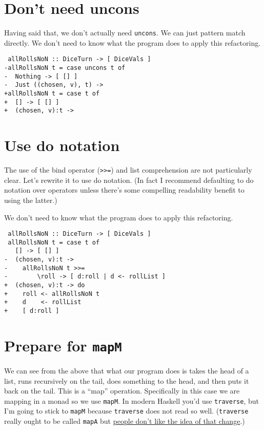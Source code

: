 \section{Don't need uncons}


Having said that, we don't actually need \texttt{uncons}. We can just pattern match directly. We don't need to know what the program does to apply this refactoring.

\begin{verbatim}
 allRollsNoN :: DiceTurn -> [ DiceVals ]
-allRollsNoN t = case uncons t of
-  Nothing -> [ [] ]
-  Just ((chosen, v), t) ->
+allRollsNoN t = case t of
+  [] -> [ [] ]
+  (chosen, v):t ->
\end{verbatim}

\section{Use do notation}

The use of the bind operator (\texttt{>>=}) and list comprehension are not particularly clear. Let's rewrite it to use do notation. (In fact I recommend defaulting to do notation over operators unless there's some compelling readability benefit to using the latter.)

We don't need to know what the program does to apply this refactoring.

\begin{verbatim}
 allRollsNoN :: DiceTurn -> [ DiceVals ]
 allRollsNoN t = case t of
   [] -> [ [] ]
-  (chosen, v):t ->
-    allRollsNoN t >>=
-        \roll -> [ d:roll | d <- rollList ]
+  (chosen, v):t -> do
+    roll <- allRollsNoN t
+    d    <- rollList
+    [ d:roll ]
\end{verbatim}


\section{Prepare for \texttt{mapM}}

We can see from the above that what our program does is takes the head of a list, runs recursively on the tail, does something to the head, and then puts it back on the tail. This is a ``map'' operation. Specifically in this case we are mapping in a monad so we use \texttt{mapM}. In modern Haskell you'd use \texttt{traverse}, but I'm going to stick to \texttt{mapM} because \texttt{traverse} does not read so well. (\texttt{traverse} really ought to be called \texttt{mapA} but \href{https://www.reddit.com/r/haskell/comments/68w09h/proposal_to_add_mapa_as_synonym_for_traverse/}{people don't like the idea of that change}.)

